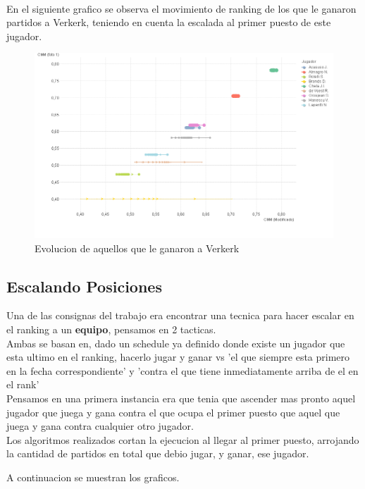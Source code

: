 \\
En el siguiente grafico se observa el movimiento de ranking de los que le ganaron partidos a Verkerk, teniendo en cuenta la escalada al primer puesto de este jugador.
\\
\begin{figure}[H]
\centering
\includegraphics[width=1\textwidth]{IMG/partidos jugados vs verkerk grafico.png}
\caption{Evolucion de aquellos que le ganaron a Verkerk}
\label{fig:Evolucion de aquellos que le ganaron a Verkerk}
\end{figure}

\subsection{Escalando Posiciones}

Una de las consignas del trabajo era encontrar una tecnica para hacer escalar en el ranking a un \textbf{equipo}, pensamos en 2 tacticas. 
\\
Ambas se basan en, dado un schedule ya definido donde existe un jugador que esta ultimo en el ranking, hacerlo jugar y ganar vs 'el que siempre esta primero en la fecha correspondiente' y 'contra el que tiene inmediatamente arriba de el en el rank'
\\
Pensamos en una primera instancia era que tenia que ascender mas pronto aquel jugador que juega y gana contra el que ocupa el primer puesto que aquel que juega y gana contra cualquier otro jugador.
\\
Los algoritmos realizados cortan la ejecucion al llegar al primer puesto, arrojando la cantidad de partidos en total que debio jugar, y ganar, ese jugador.

A continuacion se muestran los graficos.


